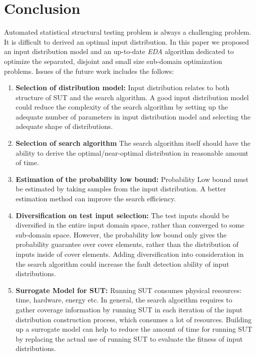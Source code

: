 \documentclass[journal]{IEEEtran}
\begin{document}
\section{Conclusion}
Automated statistical structural testing problem is always a challenging problem. It is difficult to derived an optimal input distribution. In this paper we proposed an input distribution model and an up-to-date \emph{EDA} algorithm dedicated to optimize the separated, disjoint and small size sub-domain optimization problems.
Issues of the future work includes the follows:
\begin{enumerate}
	\item \label{i:a1}\textbf{Selection of distribution model:} Input distribution relates to both structure of SUT and the search algorithm. A good input distribution model could reduce the complexity of the search algorithm by setting up the adequate number of parameters in input distribution model and selecting the adequate shape of distributions.
	\item \label{i:a2}\textbf{Selection of search algorithm} The search algorithm itself should have the ability to derive the optimal/near-optimal distribution in reasonable amount of time.
	\item \label{i:a3}\textbf{Estimation of the probability low bound:}  Probability Low bound must be estimated by taking samples from the input distribution. A better estimation method can improve the search efficiency.
	\item \label{i:a4}\textbf{Diversification on test input selection:} The test inputs should be diversified in the entire input domain space, rather than converged to some sub-domain space. However, the probability low bound only gives the probability guarantee over cover elements, rather than the distribution of inputs inside of cover elements. Adding diversification into consideration in the search algorithm could increase the fault detection ability of input distributions.
	\item \label{i:a5}\textbf{Surrogate Model for SUT:} Running SUT consumes physical resources: time, hardware, energy etc. In general, the search algorithm requires to gather coverage information by running SUT in each iteration of the input distribution construction process, which consumes a lot of resources. Building up a surrogate model can help to reduce the amount of time for running SUT by replacing the actual use of running SUT to evaluate the fitness of input distributions.
\end{enumerate}
\end{document}
